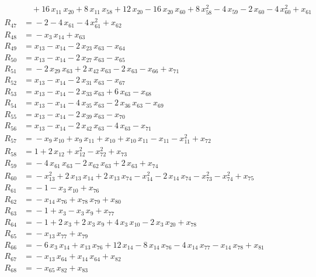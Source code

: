 \begin{align*}
&\quad{} +16\,x_{11}\,x_{20} +8\,x_{11}\,x_{58} +12\,x_{20} -16\,x_{20}\,x_{60} +8\,x_{58}^{2} -4\,x_{59} -2\,x_{60} -4\,x_{60}^{2} +x_{61} \\[3pt]
R_{47} &={} -2 -4\,x_{61} -4\,x_{61}^{2} +x_{62} \\[3pt]
R_{48} &={} -x_{3}\,x_{14} +x_{63} \\[3pt]
R_{49} &={} x_{13} -x_{14} -2\,x_{23}\,x_{63} -x_{64} \\[3pt]
R_{50} &={} x_{13} -x_{14} -2\,x_{27}\,x_{63} -x_{65} \\[3pt]
R_{51} &={} -2\,x_{29}\,x_{63} +2\,x_{42}\,x_{63} -2\,x_{63} -x_{66} +x_{71} \\[3pt]
R_{52} &={} x_{13} -x_{14} -2\,x_{31}\,x_{63} -x_{67} \\[3pt]
R_{53} &={} x_{13} -x_{14} -2\,x_{33}\,x_{63} +6\,x_{63} -x_{68} \\[3pt]
R_{54} &={} x_{13} -x_{14} -4\,x_{35}\,x_{63} -2\,x_{36}\,x_{63} -x_{69} \\[3pt]
R_{55} &={} x_{13} -x_{14} -2\,x_{39}\,x_{63} -x_{70} \\[3pt]
R_{56} &={} x_{13} -x_{14} -2\,x_{42}\,x_{63} -4\,x_{63} -x_{71} \\[3pt]
R_{57} &={} -x_{9}\,x_{10} +x_{9}\,x_{11} +x_{10} +x_{10}\,x_{11} -x_{11} -x_{11}^{2} +x_{72} \\[3pt]
R_{58} &={} 1 +2\,x_{12} +x_{12}^{2} -x_{72}^{2} +x_{73} \\[3pt]
R_{59} &={} -4\,x_{61}\,x_{63} -2\,x_{62}\,x_{63} +2\,x_{63} +x_{74} \\[3pt]
R_{60} &={} -x_{13}^{2} +2\,x_{13}\,x_{14} +2\,x_{13}\,x_{74} -x_{14}^{2} -2\,x_{14}\,x_{74} -x_{73}^{2} -x_{74}^{2} +x_{75} \\[3pt]
R_{61} &={} -1 -x_{3}\,x_{10} +x_{76} \\[3pt]
R_{62} &={} -x_{14}\,x_{76} +x_{78}\,x_{79} +x_{80} \\[3pt]
R_{63} &={} -1 +x_{3} -x_{3}\,x_{9} +x_{77} \\[3pt]
R_{64} &={} -1 +2\,x_{3} +2\,x_{3}\,x_{9} +4\,x_{3}\,x_{10} -2\,x_{3}\,x_{20} +x_{78} \\[3pt]
R_{65} &={} -x_{13}\,x_{77} +x_{79} \\[3pt]
R_{66} &={} -6\,x_{3}\,x_{14} +x_{13}\,x_{76} +12\,x_{14} -8\,x_{14}\,x_{76} -4\,x_{14}\,x_{77} -x_{14}\,x_{78} +x_{81} \\[3pt]
R_{67} &={} -x_{13}\,x_{64} +x_{14}\,x_{64} +x_{82} \\[3pt]
R_{68} &={} -x_{65}\,x_{82} +x_{83} \\[3pt]

\end{align*}
